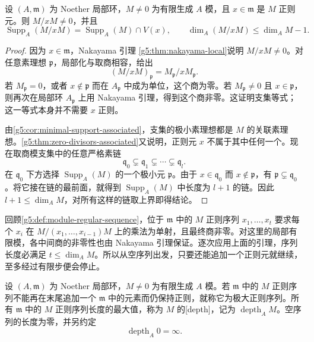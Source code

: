 \begin{lemma}\label{g5:lem:regular-element-support-drop}
	设 \((A,\mathfrak m)\) 为 Noether 局部环，\(M\ne0\) 为有限生成 \(A\) 模，且 \(x\in\mathfrak m\) 是 \(M\) 正则元。则 \(M/xM\ne0\)，并且
	\[
		\operatorname{Supp}_A(M/xM)
		=\operatorname{Supp}_A(M)\cap V(x),
		\qquad
		\dim_A(M/xM)\leq\dim_A M-1.
	\]
\end{lemma}
\begin{proof}
	因为 \(x\in\mathfrak m\)，Nakayama 引理 \cref{g5:thm:nakayama-local}说明 \(M/xM\ne0\)。对任意素理想 \(\mathfrak p\)，局部化与取商相容，给出
	\[
		(M/xM)_{\mathfrak p}
		=M_{\mathfrak p}/xM_{\mathfrak p}.
	\]
	若 \(M_{\mathfrak p}=0\)，或者 \(x\notin\mathfrak p\) 而在 \(A_{\mathfrak p}\) 中成为单位，这个商为零。若 \(M_{\mathfrak p}\ne0\) 且 \(x\in\mathfrak p\)，则再次在局部环 \(A_{\mathfrak p}\) 上用 Nakayama 引理，得到这个商非零。这证明支集等式；这一等式本身并不需要 \(x\) 正则。

	由\cref{g5:cor:minimal-support-associated}，支集的极小素理想都是 \(M\) 的关联素理想。\cref{g5:thm:zero-divisors-associated}又说明，正则元 \(x\) 不属于其中任何一个。现在取商模支集中的任意严格素链
	\[
		\mathfrak q_0\subsetneq\mathfrak q_1
		\subsetneq\cdots\subsetneq\mathfrak q_l.
	\]
	在 \(\mathfrak q_0\) 下方选择 \(\operatorname{Supp}_A(M)\) 的一个极小元 \(\mathfrak p\)。由于 \(x\in\mathfrak q_0\) 而 \(x\notin\mathfrak p\)，有 \(\mathfrak p\subsetneq\mathfrak q_0\)。将它接在链的最前面，就得到 \(\operatorname{Supp}_A(M)\) 中长度为 \(l+1\) 的链。因此 \(l+1\leq\dim_A M\)，对所有这样的链取上界即得结论。
\end{proof}

回顾\cref{g5:def:module-regular-sequence}，位于 \(\mathfrak m\) 中的 \(M\) 正则序列 \(x_1,\ldots,x_t\) 要求每个 \(x_i\) 在
\(M/(x_1,\ldots,x_{i-1})M\) 上的乘法为单射，且最终商非零。对这里的局部有限模，各中间商的非零性也由 Nakayama 引理保证。逐次应用上面的引理，序列长度必满足 \(t\leq\dim_A M\)。所以从空序列出发，只要还能追加一个正则元就继续，至多经过有限步便会停止。

\begin{definition}\label{g5:def:module-depth}
	设 \((A,\mathfrak m)\) 为 Noether 局部环，\(M\ne0\) 为有限生成 \(A\) 模。若 \(\mathfrak m\) 中的 \(M\) 正则序列不能再在末尾追加一个 \(\mathfrak m\) 中的元素而仍保持正则，就称它为极大正则序列。所有 \(\mathfrak m\) 中的 \(M\) 正则序列长度的最大值，称为 \(M\) 的[depth]，记为 \(\operatorname{depth}_A M\)。空序列的长度为零，并另约定
	\[
		\operatorname{depth}_A0=\infty.
	\]
\end{definition}

